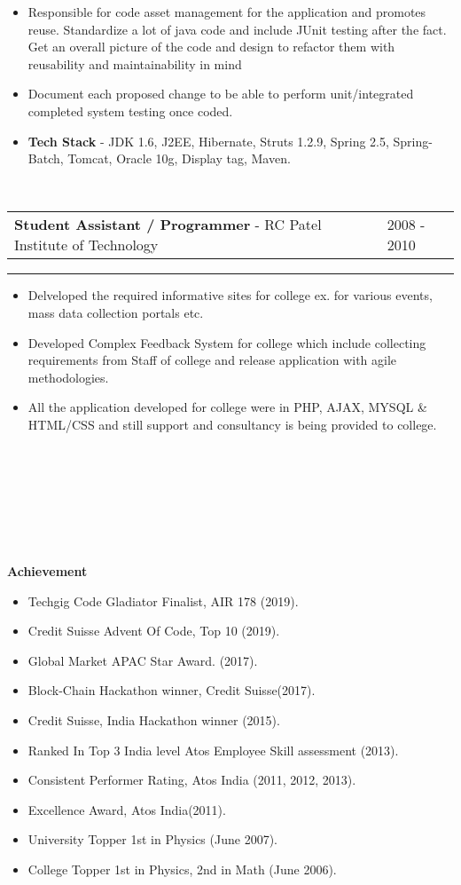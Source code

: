 \documentclass[10pt,A4]{article}
\newcommand{\cvsection}[1]
{
	\begin{center}
		\large\textcolor{sectcol}{\textbf{#1}}
	\end{center}
}
\newcommand{\cvevent}[4]
{

\begin{tabular*}{1\textwidth}{p{13.6cm}  x{3.9cm}}
	\textbf{#2} - \textcolor{bgcol}{#3} &   \vspace{2.0pt}\textcolor{sectcol}{#1}
\end{tabular*}

\vspace{-8pt}
\textcolor{softcol}{\hrule}
\vspace{6pt}

  #4 

}
\begin{document}
{\begin{itemize}
\item Responsible for code asset management for the application and promotes reuse.
Standardize a lot of java code and include JUnit testing after the fact.
Get an overall picture of the code and design to refactor them with reusability and
maintainability in mind
\item Document each proposed change to be able to perform unit/integrated completed
system testing once coded.

\item \textbf{Tech Stack} - JDK 1.6, J2EE, Hibernate, Struts 1.2.9, Spring 2.5,
Spring-Batch, Tomcat, Oracle 10g, Display tag, Maven.

\end{itemize}
}

\ \\
%
\cvevent{2008 - 2010}
{Student Assistant / Programmer}
{RC Patel Institute of Technology}
{
\begin{itemize}
	\item Delveloped the required informative sites for college ex. for various events, mass data collection portals etc.
	\item Developed Complex Feedback System for college which include collecting requirements from Staff of college and release application with agile methodologies.
	\item All the application developed for college were in PHP, AJAX, MYSQL \& HTML/CSS and still support and consultancy is being provided to college.
\end{itemize}

}

\ \\ \\
\ \\ \\
\ \\ \\

\cvsection{Achievement}

\begin{itemize}
\item Techgig Code Gladiator Finalist, AIR 178 (2019).
\item Credit Suisse Advent Of Code, Top 10 (2019).
\item Global Market APAC Star Award. (2017).
\item Block-Chain Hackathon winner, Credit Suisse(2017).
\item Credit Suisse, India Hackathon winner (2015).
\item Ranked In Top 3 India level Atos Employee Skill assessment (2013).
\item Consistent Performer Rating, Atos India (2011, 2012, 2013).
\item Excellence Award, Atos India(2011).
\item University Topper 1st in Physics (June 2007).
\item College Topper 1st in Physics, 2nd in Math (June 2006).
\end{itemize}
\end{document}
